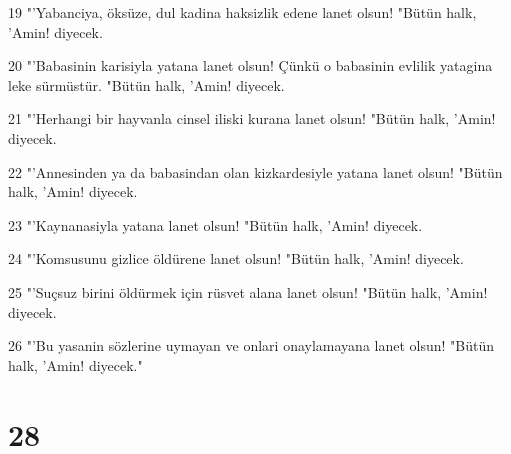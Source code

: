 \par 19 "'Yabanciya, öksüze, dul kadina haksizlik edene lanet olsun! "Bütün halk, 'Amin! diyecek.
\par 20 "'Babasinin karisiyla yatana lanet olsun! Çünkü o babasinin evlilik yatagina leke sürmüstür. "Bütün halk, 'Amin! diyecek.
\par 21 "'Herhangi bir hayvanla cinsel iliski kurana lanet olsun! "Bütün halk, 'Amin! diyecek.
\par 22 "'Annesinden ya da babasindan olan kizkardesiyle yatana lanet olsun! "Bütün halk, 'Amin! diyecek.
\par 23 "'Kaynanasiyla yatana lanet olsun! "Bütün halk, 'Amin! diyecek.
\par 24 "'Komsusunu gizlice öldürene lanet olsun! "Bütün halk, 'Amin! diyecek.
\par 25 "'Suçsuz birini öldürmek için rüsvet alana lanet olsun! "Bütün halk, 'Amin! diyecek.
\par 26 "'Bu yasanin sözlerine uymayan ve onlari onaylamayana lanet olsun! "Bütün halk, 'Amin! diyecek."

\chapter{28}

